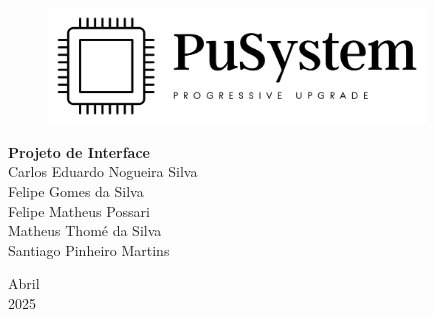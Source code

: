 \documentclass[a5paper, 12pt]{article}
\begin{document}

\begin{titlepage}
	\begin{center}
	
	\begin{figure}[!ht]
	\centering
	\includegraphics[width=10cm]{dist/LogoTransparentePreto.png} \\ 
    \end{figure}

        
		\vspace{115pt}
        \textbf{\Huge{Projeto de Interface}}\\
        
		\vspace{115pt}
        Carlos Eduardo Nogueira Silva \\
        Felipe Gomes da Silva \\
        Felipe Matheus Possari \\
        Matheus Thomé da Silva\\ 
        Santiago Pinheiro Martins \\
	\end{center}
	
	
	\vspace{1cm}
	\begin{center}
		\vspace{\fill}
		 Abril \\
		 2025
			\end{center}
\end{titlepage}


\newpage
\thispagestyle{empty}
\tableofcontents

\newpage
\pagestyle{fancy}

\fancyhead[L]{\thepage}
\fancyhead[C]{\nouppercase{\leftmark}}
\fancyfoot[R]{}
\fancyfoot[L]{}
\setlength\headheight{26pt}
\end{document}
